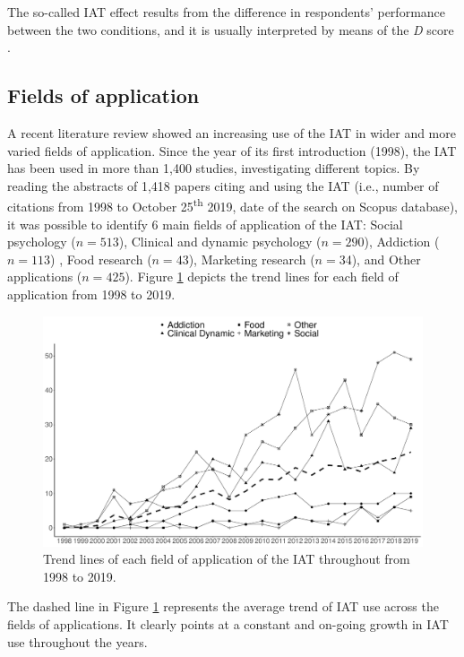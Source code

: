 \documentclass[12pt]{book}
\begin{document}
The so-called IAT effect results from the difference in respondents' performance between the two conditions, and it is usually interpreted by means of the \emph{D} score \cite[see Chapter \ref{sec:iatD}]{Greenwald2003}.


\subsection{Fields of application}

A recent literature review \cite{Epifania2020} showed an increasing use of the IAT in wider and more varied fields of application.
Since the year of its first introduction (1998), the IAT has been used in more than 1,400 studies, investigating different topics. By reading the abstracts of 1,418 papers citing and using the IAT (i.e., number of citations from 1998 to October 25\textsuperscript{th} 2019, date of the search on Scopus database), it was possible to identify 6 main fields of application of the IAT: Social psychology ($n = 513$), Clinical and dynamic psychology ($n = 290$), Addiction ($n = 113$) , Food research ($n = 43$), Marketing research ($n = $34), and Other applications ($n = 425$). 
Figure \ref{fig:topicyear} depicts the trend lines for  each field of application from 1998 to 2019. 

\begin{figure}[!h]
	\centering
	\includegraphics[width=\linewidth]{yearIATtopic.pdf}
	\caption{\label{fig:topicyear} Trend lines of each field of application of the IAT throughout from 1998 to 2019. }
\end{figure}

The dashed line in Figure \ref{fig:topicyear} represents the average trend of IAT use across the fields of applications. It clearly points at a constant and on-going growth in IAT use throughout the years. 
\end{document}
